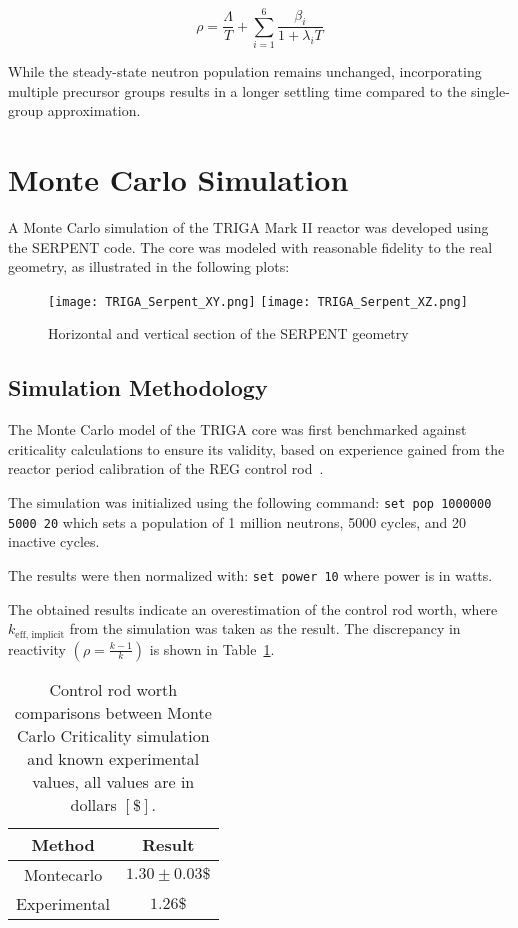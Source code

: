 \begin{equation}
    \rho = \frac{\Lambda}{T} + \sum_{i=1}^{6} \frac{\beta_i}{1 + \lambda_i T}
\end{equation}

While the steady-state neutron population remains unchanged, incorporating multiple precursor groups results in a longer settling time compared to the single-group approximation.
\section{Monte Carlo Simulation}

A Monte Carlo simulation of the TRIGA Mark II reactor was developed using the SERPENT code. The core was modeled with reasonable fidelity to the real geometry, as illustrated in the following plots:

\begin{figure}[H]
    \centering
    \texttt{[image: TRIGA\_Serpent\_XY.png]}
    \texttt{[image: TRIGA\_Serpent\_XZ.png]}
    \caption{Horizontal and vertical section of the SERPENT geometry}
    \label{fig:triga_geometry}
\end{figure}

\subsection{Simulation Methodology}

The Monte Carlo model of the TRIGA core was first benchmarked against criticality calculations to ensure its validity, based on experience gained from the reactor period calibration of the REG control rod~\cite{Lorenzi2024}.

The simulation was initialized using the following command: \texttt{set pop 1000000 5000 20} which sets a population of 1 million neutrons, 5000 cycles, and 20 inactive cycles. 

The results were then normalized with: \texttt{set power 10} where power is in watts.

The obtained results indicate an overestimation of the control rod worth, where $k_{\text{eff, implicit}} $ from the simulation was taken as the result. The discrepancy in reactivity $\left( \rho = \frac{k-1}{k} \right)$ is shown in Table~\ref{tab:montecarlo_results}.

\begin{table}[h]
    \centering
    \begin{tabular}{|c|c|}
        \hline
        \textbf{Method} & \textbf{Result} \\
        \hline
        Montecarlo & $1.30 \pm 0.03\$$ \\
        Experimental & $1.26\$$ \\
        \hline
    \end{tabular}
    \caption{Control rod worth comparisons between Monte Carlo Criticality simulation and known experimental values, all values are in dollars $\left[ \$ \right]$.}
    \label{tab:montecarlo_results}
\end{table}

